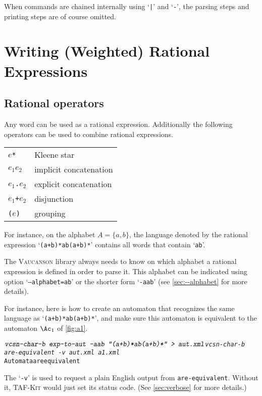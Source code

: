\documentclass[a4paper]{report}
\newcommand{\bslash}{\texttt{\symbol{92}}}
\newenvironment{shell}
{\begin{alltt}}
{\end{alltt}}
\newcommand\kbd[1]{\textsl{\texttt{#1}}}
\newcommand\command[1]{\texttt{#1}}
\newcommand\code[1]{\texttt{#1}}
\newcommand\samp[1]{`\texttt{#1}'}
\newcommand\option[1]{`\texttt{#1}'}
\newcommand{\tafkit}{\textsc{TAF-Kit}\xspace}
\newcommand{\Vauc}{\textsc{Vaucanson}\xspace}
\begin{document}
When commands are chained internally using \samp{\bslash|} and
\samp{-}, the parsing steps and printing steps are of course omitted.


\section{Writing (Weighted) Rational Expressions}

\subsection{Rational operators}

Any word can be used as a rational expression.  Additionally the
following operators can be used to combine rational expressions.

\begin{center}
  \begin{tabular}{ll}
    \hline
    $e$\code{*} & Kleene star \\
    $e_1$$e_2$ & implicit concatenation \\
    $e_1$\code{.}$e_2$ & explicit concatenation \\
    $e_1$\code{+}$e_2$ & disjunction \\
    \code{(}$e$\code{)} & grouping \\
    \hline
  \end{tabular}
\end{center}

For instance, on the alphabet $A=\{a,b\}$, the language denoted
by the rational expression \samp{(a+b)*ab(a+b)*} contains all words
that contain \samp{ab}.

The \Vauc library always needs to know on which alphabet a rational
expression is defined in order to parse it.  This alphabet can be
indicated using option \option{--alphabet=ab} or the shorter form
\option{-aab} (see \autoref{sec:--alphabet} for more details).

For instance, here is how to create an automaton that recognizes the
same language as \samp{(a+b)*ab(a+b)*}, and make sure this automaton
is equivalent to the automaton $\Ac_1$ of \autoref{fig:a1}.

\begin{shell}
$ \kbd{vcsn-char-b exp-to-aut -aab "(a+b)*ab(a+b)*" > aut.xml}
$ \kbd{vcsn-char-b are-equivalent -v aut.xml a1.xml}
Automata are equivalent
\end{shell}%

\noindent The \option{-v} is used to request a plain English output
from \command{are-equivalent}.  Without it, \tafkit would just set its
status code.  (See \autoref{sec:verbose} for more details.)
\end{document}
